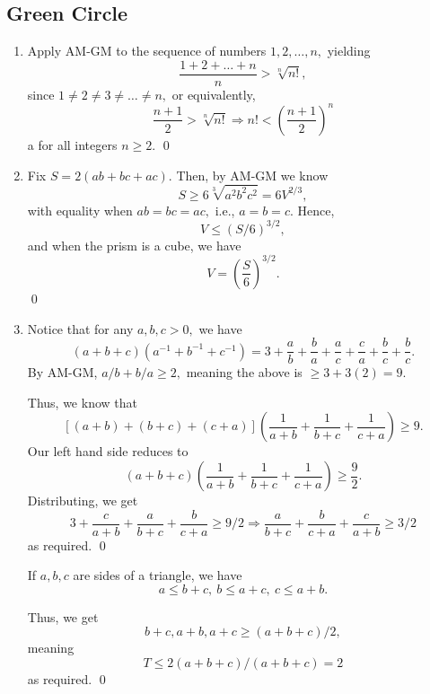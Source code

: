 \documentclass[12pt]{article}
\begin{document}
\subsection{Green Circle}
\begin{enumerate}
  \item[2] Apply AM-GM to the sequence of numbers $1, 2, \ldots, n,$ yielding
    $$
    \dfrac{1 + 2+ \ldots + n}{n} > \sqrt[n]{n!},
    $$
    since $1 \neq 2 \neq 3 \neq \ldots \neq n,$
    or equivalently,
    $$
    \dfrac{n + 1}{2}> \sqrt[n]{n!} \Rightarrow n! <
    \left(\dfrac{n+1}{2}\right)^{n}
    $$a
    for all integers $n \geq 2.$ \qed

  \item[3] Fix $S = 2(ab + bc + ac).$ Then, by AM-GM we know
    $$
    S \geq 6\sqrt[3]{a^2 b^2 c^2} = 6{V^{2/3}},
    $$
    with equality when $ab = bc = ac,$ i.e., $a = b = c.$ Hence,
    $$
    V \leq (S/6)^{3/2},
    $$
    and when the prism is a cube, we have
    $$
    V = \left(\dfrac{S}{6} \right)^{3/2}.
    $$ \qed

  \item[5] Notice that for any $a, b, c > 0,$ we have
    $$
    (a + b + c)(a^{-1} + b^{-1} + c^{-1}) = 3 + \dfrac{a}{b} +
    \dfrac{b}{a} + \dfrac{a}{c} + \dfrac{c}{a} + \dfrac{b}{c} + \dfrac{b}{c}.
    $$
    By AM-GM, $a/b + b/a \geq 2,$ meaning the above is $\geq 3 + 3(2) = 9.$

    Thus, we know that
    $$
    [(a +b) + (b + c) + (c +a)]\left(\dfrac{1}{a + b} + \dfrac{1}{b +
    c} + \dfrac{1}{c + a}\right) \geq 9.
    $$
    Our left hand side reduces to
    $$
    (a  + b + c)\left(
      \dfrac{1}{a + b}  + \dfrac{1}{b  + c} + \dfrac{1}{c + a}
    \right) \geq \dfrac{9}{2}.
    $$
    Distributing, we get
    $$
    3 + \dfrac{c}{a + b} + \dfrac{a}{b+c} + \dfrac{b}{c + a} \geq 9/2
    \Rightarrow \dfrac{a}{b + c} + \dfrac{b}{ c + a} + \dfrac{c}{a + b} \geq 3/2
    $$
    as required. \qed

    If $a, b, c$ are sides of a triangle, we have $$
    a \leq b + c, \ b \leq a + c, \ c \leq a + b.
    $$

    Thus, we get
    $$
    b + c, a + b, a + c \geq (a + b+ c)/ 2,
    $$
    meaning
    $$
    T \leq 2( a+ b+ c)/(a+b+c) = 2
    $$
    as required. \qed
\end{enumerate}
\end{document}
